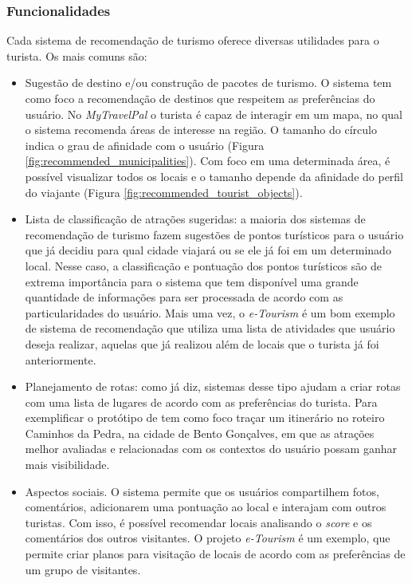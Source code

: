 \subsubsection{Funcionalidades}
\label{subsubsec:eTourism_classification_functionalities}

Cada sistema de recomendação de turismo oferece diversas utilidades para o turista. Os mais comuns são:

\begin{itemize}
    \item Sugestão de destino e/ou construção de pacotes de turismo. O sistema tem como foco a recomendação de destinos que respeitem as preferências do usuário. No \textit{MyTravelPal} \citep{article} o turista é capaz de interagir em um mapa, no qual o sistema recomenda áreas de interesse na região. O tamanho do círculo indica o grau de afinidade com o usuário (Figura \ref{fig:recommended_municipalities}). Com foco em uma determinada área, é possível visualizar todos os locais e o tamanho depende da afinidade do perfil do viajante (Figura \ref{fig:recommended_tourist_objects}).
    \item Lista de classificação de atrações sugeridas: a maioria dos sistemas de recomendação de turismo fazem sugestões de pontos turísticos para o usuário que já decidiu para qual cidade viajará ou se ele já foi em um determinado local. Nesse caso, a classificação e pontuação dos pontos turísticos são de extrema importância para o sistema que tem disponível uma grande quantidade de informações para ser processada de acordo com as particularidades do usuário. Mais uma vez, o \textit{e-Tourism} \citep{4669760} é um bom exemplo de sistema de recomendação que utiliza uma lista de atividades que usuário deseja realizar, aquelas que já realizou além de locais que o turista já foi anteriormente.
    \item Planejamento de rotas: como já diz, sistemas desse tipo ajudam a criar rotas com uma lista de lugares de acordo com as preferências do turista. Para exemplificar o protótipo de \cite{Moura:2013:DUT:2526188.2526215} tem como foco traçar um itinerário no roteiro Caminhos da Pedra, na cidade de Bento Gonçalves, em que as atrações melhor avaliadas e relacionadas com os contextos do usuário possam ganhar mais visibilidade.
    \item Aspectos sociais. O sistema permite que os usuários compartilhem fotos, comentários, adicionarem uma pontuação ao local e interajam com outros turistas. Com isso, é possível recomendar locais analisando o \textit{score} e os comentários dos outros visitantes. O projeto \textit{e-Tourism} \citep{4669760} é um exemplo, que permite criar planos para visitação de locais de acordo com as preferências de um grupo de visitantes.
\end{itemize}

